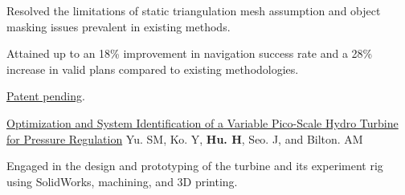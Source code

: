 \begin{cventries}
{\begin{cvitems}
      \item {Resolved the limitations of static triangulation mesh assumption and object masking issues prevalent in existing methods.
      }
      \item {Attained up to an 18\% improvement in navigation success rate and a 28\% increase in valid plans compared to existing methodologies.}
      \item \href{https://patents.google.com/patent/US20220135068A1/en}{Patent pending}.
    \end{cvitems}
    }
  \cvpublicationentrysimple
    {\href{https://asmedigitalcollection.asme.org/POWER/proceedings-abstract/POWER2020/83747/V001T08A020/1088386}{Optimization and System Identification of a Variable Pico-Scale Hydro Turbine for Pressure Regulation}} %
    {Yu. SM, Ko. Y, \textbf{Hu. H}, Seo. J, and Bilton. AM \hspace*{0pt}\hfill {}} %
    {
    \begin{cvitems}
      \item Engaged in the design and prototyping of the turbine and its experiment rig using SolidWorks, machining, and 3D printing.
    \end{cvitems}
    }
\end{cventries}








